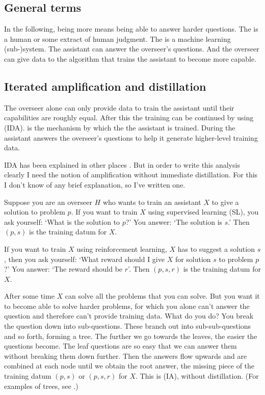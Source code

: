 \documentclass{farlamp}
\begin{document}
\subsection{General terms}

In the following, being more  means being able to answer harder
questions. The  is a human or some extract of human judgment. The
 is a machine learning (sub-)system. The assistant can answer
the overseer's questions. And the overseer can give data to the algorithm
that trains the assistant to become more capable.


\subsection{Iterated amplification and distillation}

The overseer alone can only provide data to train the assistant until their
capabilities are roughly equal. After this the training can be continued by
using  (IDA). 
is the mechanism by which the the assistant is trained. During
 the assistant answers the overseer's questions to help it
generate higher-level training data.

IDA has been explained in other places \parencite{CotrIDA, ESSMLPIDA}. But in
order to write this analysis clearly I need the notion of amplification without
immediate distillation. For this I don't know of any brief explanation, so I've
written one.

Suppose you are an overseer $H$ who wants to train an assistant $X$
\parencite[symbols taken from][]{CSASupAmp} to give a solution to problem $p$.
If you want to train $X$ using supervised learning (SL), you ask yourself: ‘What
is the solution to $p$?’ You answer: ‘The solution is $s$.’ Then $(p, s)$ is the
training datum for $X$.

If you want to train $X$ using reinforcement learning, $X$ has to suggest a
solution $s$, then you ask yourself: ‘What reward should I give $X$ for solution
$s$ to problem $p$?’ You answer: ‘The reward should be $r$’. Then $(p, s, r)$ is
the training datum for $X$.

After some time $X$ can solve all the problems that you can solve. But you want
it to become able to solve harder problems, for which you alone can't answer the
question and therefore can't provide training data. What do you do? You break
the question down into sub-questions. These branch out into sub-sub-questions
and so forth, forming a tree. The further we go towards the leaves, the easier
the questions become. The leaf questions are so easy that we can answer them
without breaking them down further. Then the answers flow upwards and are
combined at each node until we obtain the root answer, the missing piece of the
training datum $(p, s)$ or $(p, s, r)$ for $X$. This is  (IA), without distillation. (For examples of trees, see
\textcite{StuhFacCog}.)
\end{document}
